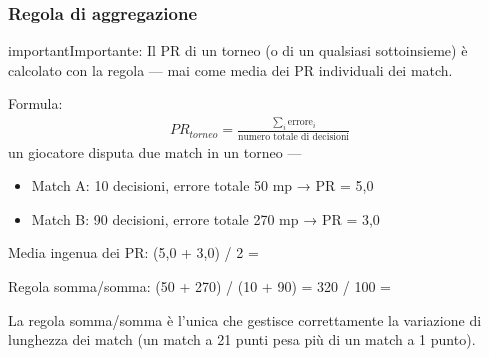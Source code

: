 \documentclass[letterpaper,10pt,italian]{sphinxmanual}
\begin{document}
\subsubsection{Regola di aggregazione}
\label{\detokenize{manuel:regle-d-agregation}}
\begin{sphinxadmonition}{important}{Importante:}
\sphinxAtStartPar
Il PR di un torneo (o di un qualsiasi sottoinsieme) è calcolato con la regola  — mai come media dei PR individuali dei match.

\sphinxAtStartPar
Formula:
\begin{equation*}
\begin{split}PR_{torneo} = \frac{\sum_{i} \text{errore}_i}{\text{numero totale di decisioni}}\end{split}
\end{equation*}
\sphinxAtStartPar
{} un giocatore disputa due match in un torneo —
\begin{itemize}
\item {} 
\sphinxAtStartPar
Match A: 10 decisioni, errore totale 50 mp → PR = 5,0

\item {} 
\sphinxAtStartPar
Match B: 90 decisioni, errore totale 270 mp → PR = 3,0

\end{itemize}

\sphinxAtStartPar
Media ingenua dei PR: (5,0 + 3,0) / 2 =  

\sphinxAtStartPar
Regola somma/somma: (50 + 270) / (10 + 90) = 320 / 100 =  

\sphinxAtStartPar
La regola somma/somma è l’unica che gestisce correttamente la variazione di lunghezza dei match (un match a 21 punti pesa più di un match a 1 punto).
\end{sphinxadmonition}
\end{document}
